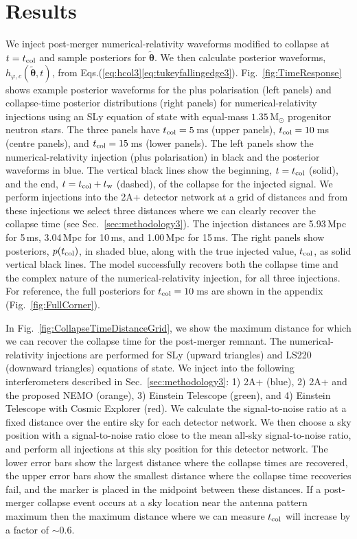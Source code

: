 \documentclass[../Thesis.tex]{subfiles}
\begin{document}
\section{Results}\label{sec:results3}
    We inject post-merger numerical-relativity waveforms modified to collapse at $t=t_{\mathrm{col}}$ and sample posteriors for $\boldsymbol{\tilde{\theta}}$.
    We then calculate posterior waveforms, $h_{\varphi,c}(\boldsymbol{\tilde{\theta}},t)$, from Eqs.(\ref{eq:hcol3}\Hyphdash*\ref{eq:tukeyfallingedge3}).
    Fig.~\ref{fig:TimeResponse} shows example posterior waveforms for the plus polarisation (left panels) and collapse-time posterior distributions (right panels) for numerical-relativity injections using an SLy equation of state with equal-mass $1.35\,\mathrm{M}_\odot$ progenitor neutron stars.
    The three panels have $t_{\mathrm{col}}=5$\,ms (upper panels), $t_{\mathrm{col}}=10$\,ms (centre panels), and $t_{\mathrm{col}}=15$\,ms (lower panels).
    The left panels show the numerical-relativity injection (plus polarisation) in black and the posterior waveforms in blue.
    The vertical black lines show the beginning, $t=t_{\mathrm{col}}$ (solid), and the end, $t=t_{\mathrm{col}}+t_{\mathrm{w}}$ (dashed), of the collapse for the injected signal.
    We perform injections into the 2A+ detector network at a grid of distances  and from these injections we select three distances where we can clearly recover the collapse time (see Sec.~\ref{sec:methodology3}).
    The injection distances are 5.93\,Mpc for 5\,ms, 3.04\,Mpc for 10\,ms, and 1.00\,Mpc for 15\,ms.
    The right panels show posteriors, $p(t_{\mathrm{col}})$, in shaded blue, along with the true injected value, $t_{\mathrm{col}}$, as solid vertical black lines.
    The model successfully recovers both the collapse time and the complex nature of the numerical-relativity injection, for all three injections.
    For reference, the full posteriors for $t_{\mathrm{col}}=10\,$ms are shown in the appendix (Fig.~\ref{fig:FullCorner}).\par

\par
    In Fig.~\ref{fig:CollapseTimeDistanceGrid}, we show the maximum distance for which we can recover the collapse time for the post-merger remnant.
    The numerical-relativity injections are performed for SLy (upward triangles) and LS220 (downward triangles) equations of state.
    We inject into the following interferometers described in Sec.~\ref{sec:methodology3}: 1) 2A+ (blue), 2) 2A+ and the proposed NEMO (orange), 3) Einstein Telescope (green), and 4) Einstein Telescope with Cosmic Explorer (red).
    We calculate the signal-to-noise ratio at a fixed distance over the entire sky for each detector network.
    We then choose a sky position with a signal-to-noise ratio close to the mean all-sky signal-to-noise ratio, and perform all injections at this sky position for this detector network.
    The lower error bars show the largest distance where the collapse times are recovered, the upper error bars show the smallest distance where the collapse time recoveries fail, and the marker is placed in the midpoint between these distances.
    If a post-merger collapse event occurs at a sky location near the antenna pattern maximum then the maximum distance where we can measure $t_{\mathrm{col}}$ will increase by a factor of $\sim\!0.6$.
    \par
    
\end{document}
